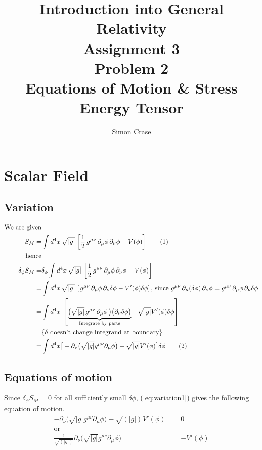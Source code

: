 \documentclass[]{article}
\title{Introduction into General Relativity\\Assignment 3\\Problem 2\\Equations of Motion \& Stress Energy Tensor}
\author{Simon Crase}
\newcommand\numberthis{\addtocounter{equation}{1}\tag{\theequation}}
\begin{document}
\maketitle
\thispagestyle{fancy}

 

\section{Scalar Field}
\subsection{Variation}
\begin{align*}
\text{We are given}&\\
S_M =& \int d^4x \, \sqrt{|g|} \, \left[\frac12 \, g^{\mu\nu} \, \partial_\mu \phi \, \partial_\nu \phi - V(\phi)\right] \numberthis \label{eq:action1}\\
\text{hence}&\\	
\delta_{\phi} S_M =& \delta_{\phi} \int d^4x \, \sqrt{|g|} \, \left[\frac{1}{2} \, g^{\mu\nu} \, \partial_\mu \phi \, \partial_\nu \phi - V(\phi)\right]\\
=&  \int d^4x \, \sqrt{|g|} \, \left[ \, g^{\mu\nu} \, \partial_\mu \phi \, \partial_\nu \delta \phi - V'(\phi) \delta \phi \right] \text{, since $g^{\mu\nu} \, \partial_\mu (\delta \phi) \, \partial_\nu \phi = g^{\mu\nu} \, \partial_\mu  \phi \, \partial_\nu \delta \phi$}\\
=&  \int d^4x \,  \, \left[ \underbrace{\big(\sqrt{|g|} \, g^{\mu\nu} \, \partial_\mu \phi \,\big) \big(\partial_\nu \delta \phi\big)}_\text{Integrate by parts} - \sqrt{|g|} V'(\phi) \delta \phi \right] \\
&\text{\{$\delta$ doesn't change integrand at boundary\}} \\
=& \int d^4x \big[ -\partial_\nu \big(\sqrt{|g|} g^{\mu\nu} \partial_\mu \phi\big) - \sqrt{|g|} V'(\phi)\big] \delta \phi \numberthis \label{eq:variation1}
\end{align*}
\subsection{Equations of motion}
Since $\delta_{\phi} S_M=0$ for all sufficiently small $\delta \phi$, (\ref{eq:variation1}) gives the following equation of motion.
\begin{align*}
-\partial_\nu \big(\sqrt{|g|} g^{\mu\nu} \partial_\mu \phi\big) - \sqrt{(|g|)} V'(\phi)=&0\\
\text{or}&\\
\frac{1}{\sqrt{(|g|)}} \partial_\nu \big(\sqrt{|g|} g^{\mu\nu} \partial_\mu \phi\big) =& -  V'(\phi)
\end{align*}
\end{document}
